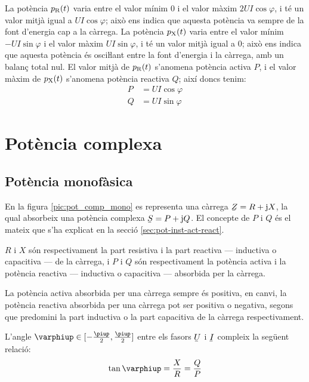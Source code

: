 La potència $p_\mathrm{R}(t)$ varia entre el valor mínim 0 i el valor màxim $2 U I \cos\varphi$, i té un valor mitjà igual a $U I \cos\varphi$; això ens indica que aquesta potència va sempre de la font d'energia cap a la càrrega. La potència $p_\mathrm{X}(t)$ varia entre el valor mínim $-U I \sin\varphi$ i el valor  màxim $U I \sin\varphi$, i té un valor mitjà igual a 0; això ens indica que aquesta potència és osciŀlant entre la font d'energia i la càrrega, amb un balanç total nul. El valor mitjà de $p_\mathrm{R}(t)$ s'anomena potència activa $P$, i el valor màxim de $p_\mathrm{X}(t)$ s'anomena potència reactiva $Q$; així doncs tenim:
\begin{align}
  P &= U I \cos\varphi \\
  Q &= U I \sin\varphi
\end{align}

\section{Potència complexa}\label{sec:pot_complex} 

\subsection{Potència monofàsica} 

En la figura \vref{pic:pot_comp_mono} es representa una càrrega $\cmplx{Z}=R+\ju X$, la
qual absorbeix una potència complexa $\cmplx{S} = P + \ju Q$. El concepte de $P$ i $Q$ és el mateix que s'ha explicat en la secció \ref{sec:pot-inst-act-react}.
\begin{center}
    
    \label{pic:pot_comp_mono}
\end{center}

$R$ i $X$ són respectivament la part resistiva i la part reactiva ---
inductiva o capacitiva --- de la càrrega, i $P$ i $Q$ són
respectivament la potència activa i la potència reactiva --- inductiva
o capacitiva --- absorbida per la càrrega.

La potència activa absorbida per una càrrega sempre és positiva, en
canvi, la potència reactiva absorbida per una càrrega pot ser
positiva o negativa, segons que predomini la part inductiva o la
part capacitiva de la càrrega respectivament.

L'angle $\varphiup\in[-\frac{\piup}{2},\frac{\piup}{2}]$ entre els fasors $\cmplx{U}$ i $\cmplx{I}$ compleix la següent relació:
\begin{equation}
   \tan\varphiup = \frac{X}{R} = \frac{Q}{P}
\end{equation}

